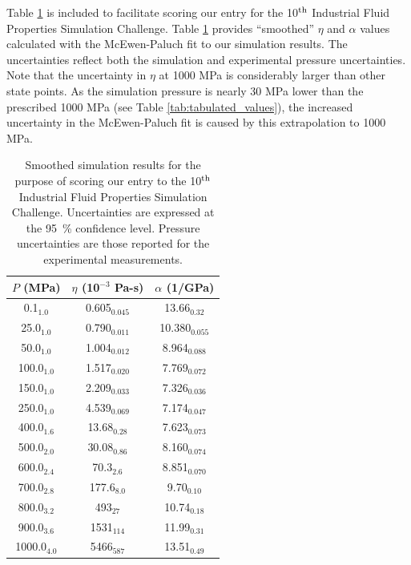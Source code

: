 \documentclass[preprint,review,12pt]{elsarticle}
\begin{document}
	Table \ref{tab:smoothed_values} is included to facilitate scoring our entry for the 10$^{\rm th}$ Industrial Fluid Properties Simulation Challenge. Table \ref{tab:smoothed_values} provides ``smoothed'' $\eta$ and $\alpha$ values calculated with the McEwen-Paluch fit to our simulation results. The uncertainties reflect both the simulation and experimental pressure uncertainties. Note that the uncertainty in $\eta$ at 1000 MPa is considerably larger than other state points. As the simulation pressure is nearly 30 MPa lower than the prescribed 1000 MPa (see Table \ref{tab:tabulated_values}), the increased uncertainty in the McEwen-Paluch fit is caused by this extrapolation to 1000 MPa.
	
	\begin{table}[htb!]
		\caption{Smoothed simulation results for the purpose of scoring our entry to the 10$^{\rm th}$ Industrial Fluid Properties Simulation Challenge. Uncertainties are expressed at the 95~\% confidence level. Pressure uncertainties are those reported for the experimental measurements.} \label{tab:smoothed_values}
		\begin{center}
			\begin{tabular}{|c|c|c|}
				\hline
				$P$ (MPa) & 	$\eta$ (10$^{-3}$ Pa-s) & 	$\alpha$ (1/GPa) \\ \hline
				0.1$_{1.0}$ & 	0.605$_{0.045}$ & 	13.66$_{0.32}$ \\
				25.0$_{1.0}$ & 	0.790$_{0.011}$ & 	10.380$_{0.055}$ \\
				50.0$_{1.0}$ & 	1.004$_{0.012}$ & 	8.964$_{0.088}$ \\
				100.0$_{1.0}$ & 	1.517$_{0.020}$ & 	7.769$_{0.072}$ \\
				150.0$_{1.0}$ & 	2.209$_{0.033}$ & 	7.326$_{0.036}$ \\
				250.0$_{1.0}$ & 	4.539$_{0.069}$ & 	7.174$_{0.047}$ \\
				400.0$_{1.6}$ & 	13.68$_{0.28}$ & 	7.623$_{0.073}$ \\
				500.0$_{2.0}$ & 	30.08$_{0.86}$ & 	8.160$_{0.074}$ \\
				600.0$_{2.4}$ & 	70.3$_{2.6}$ & 	8.851$_{0.070}$ \\
				700.0$_{2.8}$ & 	177.6$_{8.0}$ & 	9.70$_{0.10}$ \\
				800.0$_{3.2}$ & 	493$_{27}$ & 	10.74$_{0.18}$ \\
				900.0$_{3.6}$ & 	1531$_{114}$ & 	11.99$_{0.31}$ \\
				1000.0$_{4.0}$ & 	5466$_{587}$ & 	13.51$_{0.49}$ \\
				\hline
			\end{tabular}
		\end{center} 
	\end{table} 
	
\end{document}
